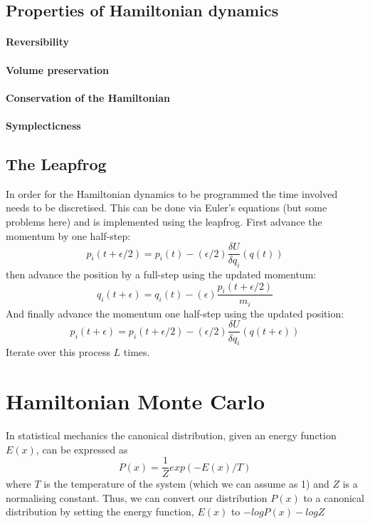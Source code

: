\documentclass[11pt]{article}
\begin{document}
\subsection{Properties of Hamiltonian dynamics}

\paragraph{Reversibility}
\paragraph{Volume preservation}
\paragraph{Conservation of the Hamiltonian}
\paragraph{Symplecticness}
\subsection{The Leapfrog}
In order for the Hamiltonian dynamics to be programmed the time involved needs to be discretised. This can be done via Euler's equations (but some problems here) and is implemented using the leapfrog.
First advance the momentum by one half-step:
\begin{equation}
p_{i}(t+\epsilon/2) = p_{i}(t) - (\epsilon/2)\frac{\delta U}{\delta q_{i}}(q(t))
\end{equation}
then advance the position by a full-step using the updated momentum:
\begin{equation}
q_{i}(t+\epsilon) = q_{i}(t) - (\epsilon)\frac{p_{i}(t+\epsilon/2)}{m_{i}}
\end{equation}
And finally advance the momentum one half-step using the updated position:
\begin{equation}
p_{i}(t+\epsilon) = p_{i}(t+\epsilon/2) - (\epsilon/2)\frac{\delta U}{\delta q_{i}}(q(t+\epsilon))
\end{equation}
Iterate over this process $L$ times.

\section{Hamiltonian Monte Carlo}
In statistical mechanics the canonical distribution, given an energy function $E(x)$, can be expressed as
\begin{equation}
P(x) = \frac{1}{Z}exp(-E(x)/T)
\end{equation}
where $T$ is the temperature of the system (which we can assume as 1) and $Z$ is a normalising constant. Thus, we can convert our distribution $P(x)$ to a canonical distribution by setting the energy function, $E(x)$ to $-logP(x)-logZ$
\end{document}
